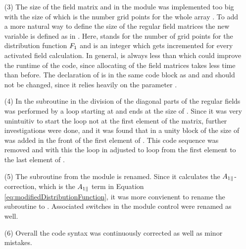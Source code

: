 \begin{enumerate}
    \newpage
    \item[(3)] The size of the field matrix  and  in the module  was implemented too big with the size of  which is the number grid points for the whole array . To add a more natural way to define the size of the regular field matrices the new variable  is defined as  in . Here,  stands for the number of grid points for the distribution function $F_1$ and  is an integer which gets incremented for every activated field calculation. In general,  is always less than  which could improve the runtime of the code, since allocating of the field matrices takes less time than before. The declaration of  is in the same code block as  and  and should not be changed, since it relies heavily on the parameter .
    \item[(4)] In the subroutine  in  the division of the diagonal parts of the regular fields was performed by a loop starting at  and ends at the size of . Since it was very unintuitiv to start the loop not at the first element of the matrix, further investigations were done, and it was found that in  a unity block of the size of  was added in the front of the first element of . This code sequence was removed and with this the loop in  adjusted to loop from the first element to the last element of .
    \item[(5)] The subroutine  from the module  is renamed. Since it calculates the $A_{1\parallel}$-correction, which is the $A_{1\parallel}$ term in Equation \ref{eq:modifiedDistributionFunction}, it was more convienent to rename the subroutine to . Associated switches in the module control were renamed as well.
    \item[(6)] Overall the code syntax was continuously corrected as well as minor mistakes. 
\end{enumerate} 

\newpage